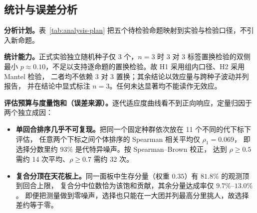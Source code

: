 \subsection{统计与误差分析}\label{sec:exp-matrix}

\textbf{分析计划。}表~\ref{tab:analysis-plan} 把五个待检验命题映射到实验与检验口径，不引入新命题。

\begin{table}[H]
  \centering
  \caption{命题、实验与检验口径。}
  \label{tab:analysis-plan}
  \footnotesize
\setlength{\tabcolsep}{3pt}
\end{table}

\textbf{统计能力。}正式实验独立随机种子仅 3 个，$n=3$ 时 $3$ 对 $3$ 标签置换检验的双侧最小
$p\approx0.10$，不足以支持逐命题的置换检验。故 H1 采用组内口径、H2 采用 Mantel 检验，
二者均不依赖 $3$ 对 $3$ 置换；其余结论以效应量与跨种子波动并列报告，
并在结论中显式标注 $n=3$。任何未达显著均不能读作无效应。

\textbf{评估预算与度量饱和（误差来源）。}逐代适应度曲线看不到正向响应，定量归因于两个独立成因：

\begin{itemize}
  \item \textbf{单回合排序几乎不可复现。}把同一个固定种群依次放在 11 个不同的代下标下评估，
        任意两个下标之间个体排序的 Spearman 相关平均仅 $\rho_1=0.069$，
        即选择分数里约 $93\%$ 是代特异噪声。按 Spearman--Brown 校正，
        达到 $\rho\ge0.5$ 需约 14 次平均、$\rho\ge0.7$ 需约 32 次。
  \item \textbf{复合分顶在天花板上。}同一面板中生存分量（权重 $0.35$）有 $81.8\%$ 的观测顶到回合上限，
        复合分中位数恰为该饱和贡献，其余分量达成率仅 $9.7\%$--$13.0\%$。
        即便把测量做到零噪声，选择也只能在一大团并列最高分里挑人，故选择差约等于零。
\end{itemize}

